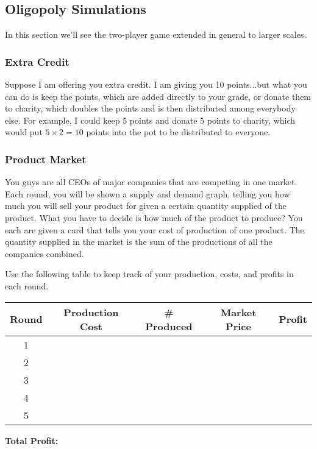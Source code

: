 \subsection{Oligopoly Simulations}
In this section we'll see the two-player game extended in general to larger scales.

\subsubsection{Extra Credit}
\begin{gm}
Suppose I am offering you extra credit. I am giving you 10 points...but what you can do is keep the points, which are added directly to your grade, or donate them to charity, which doubles the points and is then distributed among everybody else. For example, I could keep 5 points and donate 5 points to charity, which would put $5\times2 = 10$ points into the pot to be distributed to everyone.
\end{gm}

\subsubsection{Product Market}
\begin{gm}
You guys are all CEOs of major companies that are competing in one market. Each round, you will be shown a supply and demand graph, telling you how much you will sell your product for given a certain quantity supplied of the product. What you have to decide is how much of the product to produce? You each are given a card that tells you your cost of production of one product. The quantity supplied in the market is the sum of the productions of all the companies combined.

Use the following table to keep track of your production, costs, and profits in each round.

\begin{center}
\renewcommand{\arraystretch}{2.5} %
\begin{tabularx}{.9\textwidth}{|c|c|c|c|X|}
    \hline
    Round & Production Cost & \# Produced & Market Price & Profit \\
    \hline
    1&&&& \\
    \hline
    2&&&& \\
    \hline
    3&&&& \\
    \hline
    4&&&& \\
    \hline
    5&&&& \\
    \hline
\end{tabularx}
\end{center}

\vspace{0.2in}

\hspace{2.74in} \textbf{Total Profit: } \underline{\hspace{5.5cm}}

\end{gm}